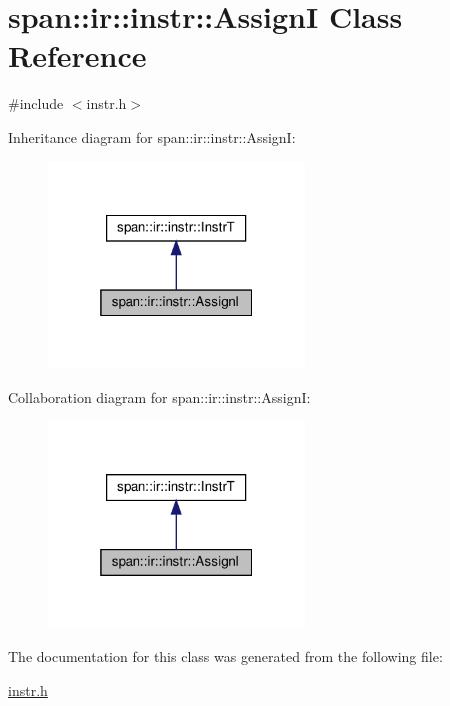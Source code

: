 \hypertarget{classspan_1_1ir_1_1instr_1_1AssignI}{}\section{span\+:\+:ir\+:\+:instr\+:\+:AssignI Class Reference}
\label{classspan_1_1ir_1_1instr_1_1AssignI}


{\ttfamily \#include $<$instr.\+h$>$}



Inheritance diagram for span\+:\+:ir\+:\+:instr\+:\+:AssignI\+:\nopagebreak
\begin{figure}[H]
\begin{center}
\leavevmode
\includegraphics[width=193pt]{classspan_1_1ir_1_1instr_1_1AssignI__inherit__graph}
\end{center}
\end{figure}


Collaboration diagram for span\+:\+:ir\+:\+:instr\+:\+:AssignI\+:\nopagebreak
\begin{figure}[H]
\begin{center}
\leavevmode
\includegraphics[width=193pt]{classspan_1_1ir_1_1instr_1_1AssignI__coll__graph}
\end{center}
\end{figure}


The documentation for this class was generated from the following file\+:\begin{DoxyCompactItemize}
\item 
\hyperlink{instr_8h}{instr.\+h}\end{DoxyCompactItemize}
